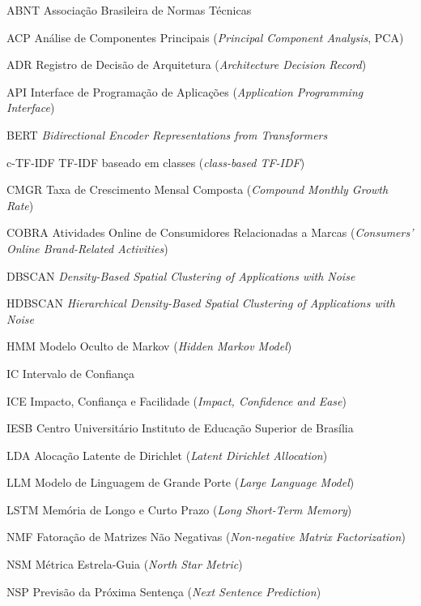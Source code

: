 \begin{siglas}
    \item[ABNT] Associação Brasileira de Normas Técnicas
    \item[ACP] Análise de Componentes Principais (\textit{Principal Component Analysis}, PCA)
    \item[ADR] Registro de Decisão de Arquitetura (\textit{Architecture Decision Record})
    \item[API] Interface de Programação de Aplicações (\textit{Application Programming Interface})
    \item[BERT] \textit{Bidirectional Encoder Representations from Transformers}
    \item[c-TF-IDF] TF-IDF baseado em classes (\textit{class-based TF-IDF})
    \item[CMGR] Taxa de Crescimento Mensal Composta (\textit{Compound Monthly Growth Rate})
    \item[COBRA] Atividades Online de Consumidores Relacionadas a Marcas (\textit{Consumers' Online Brand-Related Activities})
    \item[DBSCAN] \textit{Density-Based Spatial Clustering of Applications with Noise}
    \item[HDBSCAN] \textit{Hierarchical Density-Based Spatial Clustering of Applications with Noise}
    \item[HMM] Modelo Oculto de Markov (\textit{Hidden Markov Model})
    \item[IC] Intervalo de Confiança
    \item[ICE] Impacto, Confiança e Facilidade (\textit{Impact, Confidence and Ease})
    \item[IESB] Centro Universitário Instituto de Educação Superior de Brasília
    \item[LDA] Alocação Latente de Dirichlet (\textit{Latent Dirichlet Allocation})
    \item[LLM] Modelo de Linguagem de Grande Porte (\textit{Large Language Model})
    \item[LSTM] Memória de Longo e Curto Prazo (\textit{Long Short-Term Memory})
    \item[NMF] Fatoração de Matrizes Não Negativas (\textit{Non-negative Matrix Factorization})
    \item[NSM] Métrica Estrela-Guia (\textit{North Star Metric})
    \item[NSP] Previsão da Próxima Sentença (\textit{Next Sentence Prediction})

\end{siglas}

